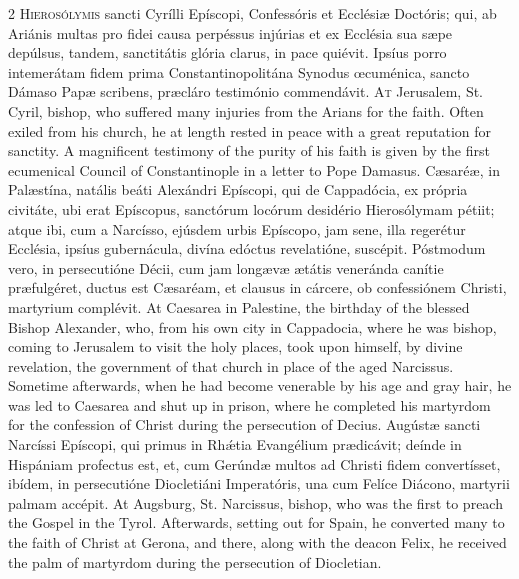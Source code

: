 \begin{paracol}{2}
\lettrine[lines=2]{H}{ierosólymis} sancti Cyrílli Epíscopi, Confessóris et Ecclésiæ 
 Doctóris; qui, ab Ariánis multas pro fidei causa perpéssus injúrias et ex 
 Ecclésia sua sæpe depúlsus, tandem, sanctitátis glória clarus, in pace 
 quiévit. Ipsíus porro intemerátam fidem prima Constantinopolitána 
 Synodus œcuménica, sancto Dámaso Papæ scribens, præcláro testimónio 
 commendávit.
\switchcolumn
{}
\lettrine[lines=2]{A}{t} Jerusalem, St. Cyril, bishop, who suffered many injuries from the Arians 
 for the faith. Often exiled from his church, he at length rested in 
 peace with a great reputation for sanctity. A magnificent testimony of 
 the purity of his faith is given by the first ecumenical Council of 
 Constantinople in a letter to Pope Damasus.
\switchcolumn*
{}
Cæsaréæ, in Palæstína, natális beáti Alexándri 
 Epíscopi, qui de Cappadócia, ex própria civitáte, ubi erat Epíscopus, 
 sanctórum locórum desidério Hierosólymam pétiit; atque ibi, cum a Narcísso, 
 ejúsdem urbis Epíscopo, jam sene, illa regerétur Ecclésia, ipsíus 
 gubernácula, divína edóctus revelatióne, suscépit. Póstmodum vero, in 
 persecutióne Décii, cum jam longævæ ætátis veneránda canítie præfulgéret, 
 ductus est Cæsaréam, et clausus in cárcere, ob confessiónem Christi, 
 martyrium complévit.
\switchcolumn
{}
At Caesarea in Palestine, the birthday of the blessed Bishop Alexander, who, 
 from his own city in Cappadocia, where he was bishop, coming to Jerusalem to 
 visit the holy places, took upon himself, by divine revelation, the 
 government of that church in place of the aged Narcissus. Sometime 
 afterwards, when he had become venerable by his age and gray hair, he was 
 led to Caesarea and shut up in prison, where he completed his martyrdom for 
 the confession of Christ during the persecution of Decius.
\switchcolumn*
{}
Augústæ sancti Narcíssi Epíscopi, qui primus in 
 Rhǽtia Evangélium prædicávit; deínde in Hispániam profectus est, et, cum 
 Gerúndæ multos ad Christi fidem convertísset, ibídem, in persecutióne 
 Diocletiáni Imperatóris, una cum Felíce Diácono, martyrii palmam accépit.
\switchcolumn
{}
At Augsburg, St. Narcissus, bishop, who was the first to preach the Gospel 
 in the Tyrol. Afterwards, setting out for Spain, he converted many to 
 the faith of Christ at Gerona, and there, along with the deacon Felix, he 
 received the palm of martyrdom during the persecution of Diocletian.

\end{paracol}
